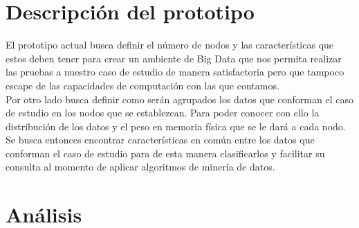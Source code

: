 \section{Descripción del prototipo} 
El prototipo actual busca definir el número de nodos y las características que estos deben tener para crear un ambiente de Big Data que nos permita realizar las pruebas a nuestro caso de estudio de manera satisfactoria pero que tampoco escape de las capacidades de computación con las que contamos.
\\
Por otro lado busca definir como serán agrupados los datos que conforman el caso de estudio en los nodos que se establezcan. Para poder conocer con ello la distribución de los datos y el peso en memoria física que se le dará a cada nodo.
\\
Se busca entonces encontrar características en común entre los datos que conforman el caso de estudio para de esta manera clasificarlos y facilitar su consulta al momento de aplicar algoritmos de minería de datos. 
\section{Análisis}
